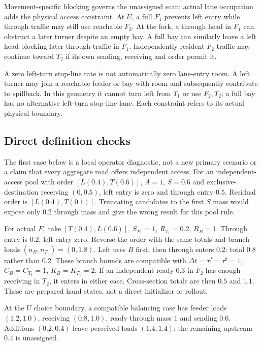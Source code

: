 \documentclass[10pt,a4paper]{article}
\begin{document}
Movement-specific blocking governs the unassigned scan; actual lane
occupation adds the physical access constraint. At $U$, a full $F_1$
prevents left entry while through traffic may still use reachable $F_2$.
At the fork, a through head in $F_1$ can obstruct a later turner despite
an empty bay. A full bay can similarly leave a left head blocking later
through traffic in $F_1$. Independently resident $F_2$ traffic may continue
toward $T_2$ if its own sending, receiving and order permit it.

A zero left-turn stop-line rate is not automatically zero lane-entry room.
A left turner may join a reachable feeder or bay with room and subsequently
contribute to spillback. In this geometry it cannot turn left from $T_1$
or use $F_2,T_2$; a full bay has no alternative left-turn stop-line lane.
Each constraint refers to its actual physical boundary.

\subsection*{Direct definition checks}

The first case below is a local operator diagnostic, not a new primary
scenario or a claim that every aggregate road offers independent access.
For an independent-access pool with order $[L(0.4),T(0.6)]$, $A=1$,
$S=0.6$ and exclusive-destination receiving $(0,0.5)$, left entry is
zero and through entry $0.5$. Residual order is $[L(0.4),T(0.1)]$.
Truncating candidates to the first $S$ mass would expose only $0.2$
through mass and give the wrong result for this pool rule.

For actual $F_1$ take $[T(0.4),L(0.6)]$, $S_{F_1}=1$, $R_{T_1}=0.2$,
$R_B=1$. Through entry is $0.2$, left entry zero.
Reverse the order with the same totals and branch loads
$(n_B,n_{T_1})=(0,1.8)$. Left uses $B$ first, then through enters $0.2$:
total $0.8$ rather than $0.2$.
These branch bounds are compatible with
$\Delta t=\tau^f=\tau^b=1$, $C_B=C_{T_1}=1$, $K_B=K_{T_1}=2$.
If an independent ready $0.3$ in $F_2$ has enough receiving in $T_2$,
it enters in either case. Cross-section totals are then $0.5$ and $1.1$.
These are prepared hand states, not a direct initializer or rollout.

At the $U$ choice boundary, a compatible balancing case has feeder loads
$(1.2,1.0)$, receiving $(0.8,1.0)$, ready through mass $1$ and sending $0.6$.
Additions $(0.2,0.4)$ leave perceived loads $(1.4,1.4)$;
the remaining upstream $0.4$ is unassigned.
\end{document}
